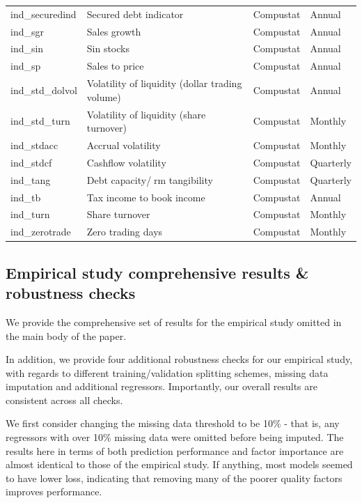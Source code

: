 \documentclass{article}
\begin{document}
\begin{center}
\begin{longtable}{llll}
			ind\_securedind & Secured debt indicator & Compustat & Annual \\
			ind\_sgr\footnotemark[\value{footnote}] & Sales growth & Compustat & Annual \\
			ind\_sin & Sin stocks & Compustat & Annual \\
			ind\_sp & Sales to price & Compustat & Annual \\
			ind\_std\_dolvol & Volatility of liquidity (dollar trading volume) & Compustat & Annual \\
			ind\_std\_turn & Volatility of liquidity (share turnover) & Compustat & Monthly \\
			ind\_stdacc\footnotemark[\value{footnote}] & Accrual volatility & Compustat & Monthly \\
			ind\_stdcf\footnotemark[\value{footnote}] & Cashflow volatility & Compustat & Quarterly \\
			ind\_tang & Debt capacity/rm tangibility & Compustat & Quarterly \\
			ind\_tb\footnotemark[\value{footnote}] & Tax income to book income & Compustat & Annual \\
			ind\_turn & Share turnover & Compustat & Monthly \\
			ind\_zerotrade & Zero trading days & Compustat & Monthly \\ \hline	
		\end{longtable}
	\end{center}
\newpage

\FloatBarrier
\subsection{Empirical study comprehensive results \& robustness checks}
\label{empirical_study_results}
We provide the comprehensive set of results for the empirical study omitted in the main body of the paper. 

In addition, we provide four additional robustness checks for our empirical study, with regards to different training/validation splitting schemes, missing data imputation and additional regressors. Importantly, our overall results are consistent across all checks.

We first consider changing the missing data threshold to be 10\% - that is, any regressors with over 10\% missing data were omitted before being imputed. The results here in terms of both prediction performance and factor importance are almost identical to those of the empirical study. If anything, most models seemed to have lower loss, indicating that removing many of the poorer quality factors improves performance.
\end{document}
